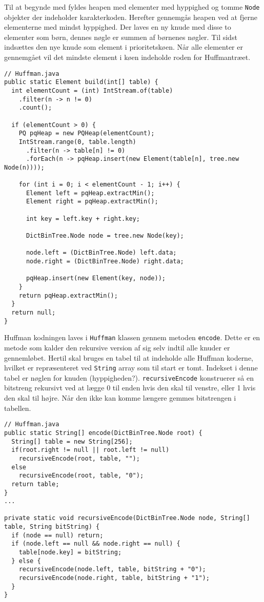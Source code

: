 \documentclass{article}
\begin{document}
Til at begynde med fyldes heapen med elementer med hyppighed og tomme \texttt{Node} objekter der indeholder karakterkoden. Herefter gennemgås heapen ved at fjerne elementerne med mindst hyppighed. Der laves en ny knude med disse to elementer som børn, dennes nøgle er summen af børnenes nøgler. Til sidst indsættes den nye knude som element i prioritetskøen. Når alle elementer er gennemgået vil det mindste element i køen indeholde roden for Huffmantræet.
\begin{lstlisting}
// Huffman.java
public static Element build(int[] table) {
  int elementCount = (int) IntStream.of(table)
    .filter(n -> n != 0)
    .count();
		
  if (elementCount > 0) {
    PQ pqHeap = new PQHeap(elementCount);
    IntStream.range(0, table.length)
      .filter(n -> table[n] != 0)
      .forEach(n -> pqHeap.insert(new Element(table[n], tree.new Node(n))));

    for (int i = 0; i < elementCount - 1; i++) {
      Element left = pqHeap.extractMin();
      Element right = pqHeap.extractMin();
	
      int key = left.key + right.key;

      DictBinTree.Node node = tree.new Node(key);
			
      node.left = (DictBinTree.Node) left.data;
      node.right = (DictBinTree.Node) right.data;
            
      pqHeap.insert(new Element(key, node));
    }
    return pqHeap.extractMin();
  }
  return null;
}
\end{lstlisting}
Huffman kodningen laves i \texttt{Huffman} klassen gennem metoden \texttt{encode}. Dette er en metode som kalder den rekursive version af sig selv indtil alle knuder er gennemløbet. Hertil skal bruges en tabel til at indeholde alle Huffman koderne, hvilket er repræsenteret ved \texttt{String} array som til start er tomt. Indekset i denne tabel er nøglen for knuden (hyppigheden?). \texttt{recursiveEncode} konstruerer så en bitstreng rekursivt ved at lægge 0 til enden hvis den skal til venstre, eller 1 hvis den skal til højre. Når den ikke kan komme længere gemmes bitstrengen i tabellen.

\begin{lstlisting}
// Huffman.java
public static String[] encode(DictBinTree.Node root) {
  String[] table = new String[256];
  if(root.right != null || root.left != null)
    recursiveEncode(root, table, "");
  else
    recursiveEncode(root, table, "0");
  return table;
}
...

private static void recursiveEncode(DictBinTree.Node node, String[] table, String bitString) {
  if (node == null) return;
  if (node.left == null && node.right == null) {
    table[node.key] = bitString;
  } else {
    recursiveEncode(node.left, table, bitString + "0");
    recursiveEncode(node.right, table, bitString + "1");
  }
}
\end{lstlisting}
\end{document}
